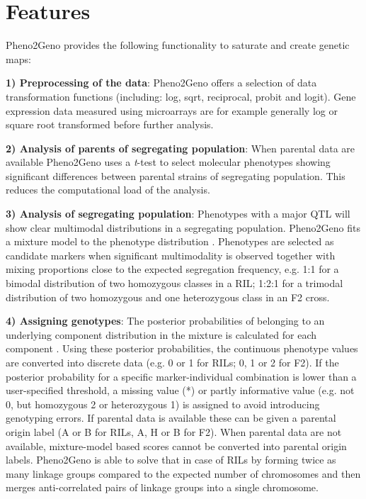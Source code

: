 \section{Features}
Pheno2Geno provides the following functionality to saturate and create genetic maps:

{\bf 1) Preprocessing of the data}: Pheno2Geno offers a selection of 
data transformation functions (including: log, sqrt, reciprocal, probit and logit). 
Gene expression data measured using microarrays are for example generally log 
\cite{Quackenbush:2002} or square root \cite{Jansen:2001a, Gort:2010} transformed before 
further analysis.

{\bf 2) Analysis of parents of segregating population}: When parental data are available 
Pheno2Geno uses a \emph{t}-test to select molecular phenotypes showing significant 
differences between parental strains of segregating population. This reduces the computational load 
of the analysis.

{\bf 3) Analysis of segregating population}:
Phenotypes with a major QTL will show clear multimodal distributions in a segregating 
population. Pheno2Geno fits a mixture model to the phenotype distribution \cite{Jansen:1993, 
Jansen:2001a, Benaglia:2009}. Phenotypes are selected as candidate markers when 
significant multimodality is observed together with mixing proportions close to the expected segregation 
frequency, e.g. 1:1 for a bimodal distribution of two homozygous classes in 
a RIL; 1:2:1 for a trimodal distribution of two homozygous and one heterozygous class in 
an F2 cross.

{\bf 4) Assigning genotypes}:
The posterior probabilities of belonging to an underlying component distribution in the 
mixture is calculated for each component \cite{Jansen:2001b, Benaglia:2009}. Using these 
posterior probabilities, the continuous phenotype values are converted into discrete data 
(e.g. 0 or 1 for RILs; 0, 1 or 2 for F2).  If the posterior probability for a specific 
marker-individual combination is lower than a user-specified threshold, a missing value 
(*) or partly informative value (e.g. not 0, but homozygous 2 or heterozygous 1) is 
assigned to avoid introducing genotyping errors. If parental data is available these can 
be given a parental origin label (A or B for RILs, A, H or B for F2). 
When parental data are not available, mixture-model based scores cannot be converted into 
parental origin labels. Pheno2Geno is able to solve that in case of RILs by forming twice 
as many linkage groups compared to the expected number of chromosomes and then merges 
anti-correlated pairs of linkage groups into a single chromosome.

